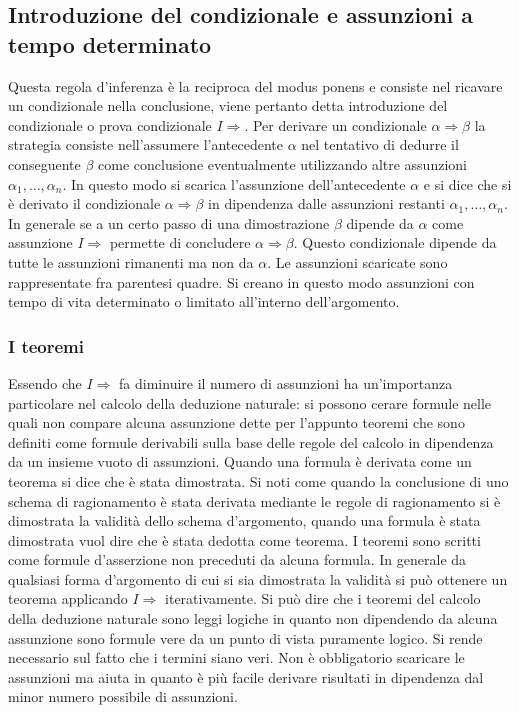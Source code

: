 \subsection{Introduzione del condizionale e assunzioni a tempo determinato}
Questa regola d'inferenza \`e la reciproca del modus ponens e consiste nel ricavare un condizionale nella conclusione, viene pertanto detta introduzione del condizionale o prova condizionale $I\Rightarrow$. 
Per derivare un condizionale $\alpha\Rightarrow\beta$ la strategia consiste nell'assumere l'antecedente $\alpha$ nel tentativo di dedurre il conseguente $\beta$ come conclusione eventualmente utilizzando 
altre assunzioni $\alpha_1,\dots,\alpha_n$. In questo modo si scarica l'assunzione dell'antecedente $\alpha$ e si dice che si \`e derivato il condizionale $\alpha\Rightarrow\beta$ in dipendenza dalle assunzioni 
restanti $\alpha_1,\dots,\alpha_n$. In generale se a un certo passo di una dimostrazione $\beta$ dipende da $\alpha$ come assunzione $I\Rightarrow$ permette di concludere $\alpha\Rightarrow\beta$. 
Questo condizionale dipende da tutte le assunzioni rimanenti ma non da $\alpha$. Le assunzioni scaricate sono rappresentate fra parentesi quadre. Si creano in questo modo assunzioni con tempo di vita 
determinato o limitato all'interno dell'argomento. 
\subsubsection{I teoremi}
Essendo che $I\Rightarrow$ fa diminuire il numero di assunzioni ha un'importanza particolare nel calcolo della deduzione naturale: si possono cerare formule nelle quali non compare alcuna assunzione dette 
per l'appunto teoremi che sono definiti come formule derivabili sulla base delle regole del calcolo in dipendenza da un insieme vuoto di assunzioni. Quando una formula \`e derivata come un teorema si dice che 
\`e stata dimostrata. Si noti come quando la conclusione di uno schema di ragionamento \`e stata derivata mediante le regole di ragionamento si \`e dimostrata la validit\`a dello schema d'argomento, quando 
una formula \`e stata dimostrata vuol dire che \`e stata dedotta come teorema. I teoremi sono scritti come formule d'asserzione non preceduti da alcuna formula. In generale da qualsiasi forma d'argomento di 
cui si sia dimostrata la validit\`a si pu\`o ottenere un teorema applicando $I\Rightarrow$ iterativamente. Si pu\`o dire che i teoremi del calcolo della deduzione naturale sono leggi logiche in quanto non 
dipendendo da alcuna assunzione sono formule vere da un punto di vista puramente logico. Si rende necessario sul fatto che i termini siano veri. Non \`e obbligatorio scaricare le assunzioni ma 
aiuta in quanto \`e pi\`u facile derivare risultati in dipendenza dal minor numero possibile di assunzioni. 
